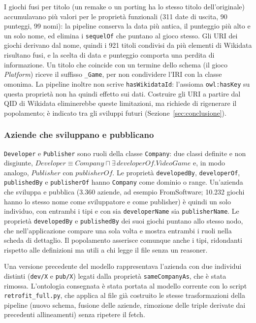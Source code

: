 I giochi fusi per titolo (un remake o un porting ha lo stesso titolo dell'originale) accumulavano pi\`u
valori per le propriet\`a funzionali (311 date di uscita, 90 punteggi, 99 nomi): la pipeline conserva la
data pi\`u antica, il punteggio pi\`u alto e un solo nome, ed elimina i \texttt{sequelOf} che puntano al gioco
stesso. Gli URI dei giochi derivano dal nome, quindi i 921 titoli condivisi da pi\`u elementi di Wikidata
risultano fusi, e la scelta di data e punteggio comporta una perdita di informazione. Un titolo che
coincide con un termine dello schema (il gioco \emph{Platform}) riceve il suffisso \texttt{\_Game}, per non
condividere l'IRI con la classe omonima. La pipeline inoltre non
scrive \texttt{hasWikidataId}: l'assioma \texttt{owl:hasKey} su questa propriet\`a non ha quindi effetto sui
dati. Costruire gli URI a partire dal QID di Wikidata eliminerebbe queste limitazioni, ma richiede di
rigenerare il popolamento; \`e indicato tra gli sviluppi futuri (Sezione~\ref{sec:conclusione}).

\subsubsection{Aziende che sviluppano e pubblicano}

\texttt{Developer} e \texttt{Publisher} sono ruoli della classe \texttt{Company}: due classi definite e non
disgiunte,
$\mathit{Developer} \equiv \mathit{Company} \sqcap \exists\,\mathit{developerOf}.\mathit{VideoGame}$ e,
in modo analogo, $\mathit{Publisher}$ con $\mathit{publisherOf}$. Le propriet\`a \texttt{developedBy},
\texttt{developerOf}, \texttt{publishedBy} e \texttt{publisherOf} hanno \texttt{Company} come dominio o range.
Un'azienda che sviluppa e pubblica (3.360 aziende, ad esempio FromSoftware; 10.232 giochi hanno lo stesso
nome come sviluppatore e come publisher) \`e quindi un solo individuo, con entrambi i tipi e con sia
\texttt{developerName} sia \texttt{publisherName}. Le propriet\`a \texttt{developedBy} e \texttt{publishedBy}
dei suoi giochi puntano allo stesso nodo, che nell'applicazione compare una sola volta e mostra entrambi i
ruoli nella scheda di dettaglio. Il popolamento asserisce comunque anche i tipi, ridondanti rispetto alle
definizioni ma utili a chi legge il file senza un reasoner.

Una versione precedente del modello rappresentava l'azienda con due individui distinti (\texttt{dev/X} e
\texttt{pub/X}) legati dalla propriet\`a \texttt{sameCompanyAs}, che \`e stata rimossa. L'ontologia
consegnata \`e stata portata al modello corrente con lo script \texttt{retrofit\_full.py}, che applica al
file gi\`a costruito le stesse trasformazioni della pipeline (nuovo schema, fusione delle aziende, rimozione
delle triple derivate dai precedenti allineamenti) senza ripetere il fetch.

